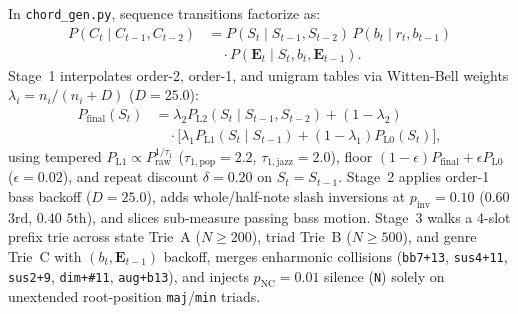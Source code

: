 In {\small\texttt{chord\_gen.py}}, sequence transitions factorize as:
\begin{equation}\label{eq:chord_factorization}
  \begin{split}
    P(C_t \!\mid\! C_{t-1}, C_{t-2}) &= P(S_t \!\mid\! S_{t-1}, S_{t-2})\,P(b_t \!\mid\! r_t, b_{t-1}) \\
    &\quad \cdot P(\mathbf{E}_t \!\mid\! S_t, b_t, \mathbf{E}_{t-1}).
  \end{split}
\end{equation}
Stage~1 interpolates order-2, order-1, and unigram tables via Witten-Bell weights $\lambda_i = n_i / (n_i + D)$ ($D = 25.0$):
\begin{equation}\label{eq:wb_backoff}
  \begin{split}
    P_{\text{final}}(S_t) &= \lambda_2 P_{\text{L2}}(S_t \!\mid\! S_{t-1}, S_{t-2}) + (1 - \lambda_2) \\
    &\quad \cdot \bigl[\lambda_1 P_{\text{L1}}(S_t \!\mid\! S_{t-1}) + (1 - \lambda_1) P_{\text{L0}}(S_t)\bigr],
  \end{split}
\end{equation}
using tempered $P_{\text{L1}} \propto P_{\text{raw}}^{1/\tau_1}$ ($\tau_{1,\text{pop}} = 2.2$, $\tau_{1,\text{jazz}} = 2.0$), floor $(1 - \epsilon) P_{\text{final}} + \epsilon P_{\text{L0}}$ ($\epsilon = 0.02$), and repeat discount $\delta = 0.20$ on $S_t = S_{t-1}$. Stage~2 applies order-1 bass backoff ($D = 25.0$), adds whole/half-note slash inversions at $p_{\text{inv}} = 0.10$ ($0.60$ $3\text{rd}$, $0.40$ $5\text{th}$), and slices sub-measure passing bass motion. Stage~3 walks a 4-slot prefix trie across state Trie~A ($N \ge 200$), triad Trie~B ($N \ge 500$), and genre Trie~C with $(b_t, \mathbf{E}_{t-1})$ backoff, merges enharmonic collisions ({\small\texttt{bb7+13}}, {\small\texttt{sus4+11}}, {\small\texttt{sus2+9}}, {\small\texttt{dim+\#11}}, {\small\texttt{aug+b13}}), and injects $p_{\text{NC}} = 0.01$ silence ({\small\texttt{N}}) solely on unextended root-position {\small\texttt{maj}}/{\small\texttt{min}} triads.

